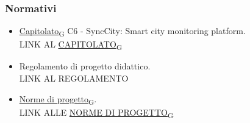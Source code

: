     \subsubsection{Normativi}
    \begin{itemize}
        \item \href{https://7last.github.io/docs/rtb/documentazione-interna/glossario#capitolato}{Capitolato\textsubscript{G}} C6 - SyncCity: Smart city monitoring platform.\\
        LINK AL \href{https://7last.github.io/docs/rtb/documentazione-interna/glossario#capitolato}{CAPITOLATO\textsubscript{G}}
        \item Regolamento di progetto didattico.\\
        LINK AL REGOLAMENTO
        \item \href{https://7last.github.io/docs/rtb/documentazione-interna/glossario#norme-di-progetto}{Norme di progetto\textsubscript{G}}.\\
        LINK ALLE \href{https://7last.github.io/docs/rtb/documentazione-interna/glossario#norme-di-progetto}{NORME DI PROGETTO\textsubscript{G}}
    \end{itemize}
        
       
